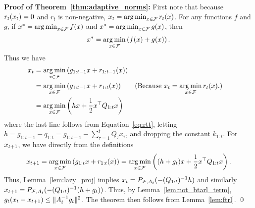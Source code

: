 \noindent
\textbf{Proof of Theorem~\ref{thm:adaptive_norms}:}
First note that because $r_t(x_t) = 0$ and  $r_t$ is non-negative, 
$x_t = \mathop{\rm arg\,min}_{x \in \mathcal{F}} r_t(x)$.  For any functions $f$ and
$g$, if $x^* = \mathop{\rm arg\,min}_{x \in \mathcal{F}} f(x)$ and $x^* = \mathop{\rm arg\,min}_{x
\in \mathcal{F}} g(x)$, then 
\[x^* = \mathop{\rm arg\,min}_{x \in \mathcal{F}} \left(f(x) +g(x)\right).\]
Thus we have
\begin {align*}
x_t
& = \mathop{\rm arg\,min}_{x \in \mathcal{F}} \left( g_{1:t-1} x + r_{1:t-1}(x) \right) \\
& = \mathop{\rm arg\,min}_{x \in \mathcal{F}} \left( g_{1:t-1} x + r_{1:t}(x) \right) 
  && \text{(Because $x_t = \mathop{\rm arg\,min}_{x \in \mathcal{F}} r_t(x)$.)}\\
& = \mathop{\rm arg\,min}_{x \in \mathcal{F}} \left( h x + \frac 1 2 x^\top Q_{1:t} x \right) \\
\end {align*}
where the last line follows from Equation~\eqref{eq:rtt},
letting $h = g_{1:t-1} - q_{1:t} = g_{1:t-1} -
\sum_{\tau=1}^{t} Q_\tau x_\tau$, and dropping the constant $k_{1:t}$.
For $x_{t+1}$, we have directly from the definitions
\begin{align*}
x_{t+1} =  \mathop{\rm arg\,min}_{x \in \mathcal{F}} \left( g_{1:t} x + r_{1:t}(x) \right) 
     = \mathop{\rm arg\,min}_{x \in \mathcal{F}} \left( (h + g_t) x + \frac 1 2  x^\top Q_{1:t} x \right).
\end{align*}
Thus, Lemma~\ref{lem:lazy_proj} implies $x_t = P_{\mathcal{F}, A_t}(
-(Q_{1:t})^{-1} h)$ and similarly $x_{t+1} = P_{\mathcal{F}, A_t}( -(Q_{1:t})^{-1} (h
+ g_t))$.  Thus, by Lemma~\ref{lem:not_btarl_term}, $g_t (x_t - x_{t+1})
\le
\| A_t^{-1} g_t \|^2$.
The theorem then follows from Lemma~\ref{lem:ftrl}.
\qed

